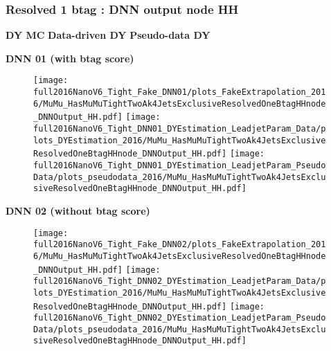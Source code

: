 \documentclass[9pt]{beamer}
\begin{document}
\begin{frame}
	\frametitle{Resolved 1 btag : DNN output node HH}
    \hspace{2cm} \textbf{DY MC} \hspace{1.9cm} \textbf{Data-driven DY} \hspace{1cm} \textbf{Pseudo-data DY}
    \begin{center}
        \textbf{DNN 01 (with btag score)}
    \end{center}
	\begin{figure}
		\texttt{[image: full2016NanoV6\_Tight\_Fake\_DNN01/plots\_FakeExtrapolation\_2016/MuMu\_HasMuMuTightTwoAk4JetsExclusiveResolvedOneBtagHHnode\_DNNOutput\_HH.pdf]}
		\texttt{[image: full2016NanoV6\_Tight\_DNN01\_DYEstimation\_LeadjetParam\_Data/plots\_DYEstimation\_2016/MuMu\_HasMuMuTightTwoAk4JetsExclusiveResolvedOneBtagHHnode\_DNNOutput\_HH.pdf]}
		\texttt{[image: full2016NanoV6\_Tight\_DNN01\_DYEstimation\_LeadjetParam\_PseudoData/plots\_pseudodata\_2016/MuMu\_HasMuMuTightTwoAk4JetsExclusiveResolvedOneBtagHHnode\_DNNOutput\_HH.pdf]}
	\end{figure}
    \begin{center}
        \textbf{DNN 02 (without btag score)}
    \end{center}
	\begin{figure}
		\texttt{[image: full2016NanoV6\_Tight\_Fake\_DNN02/plots\_FakeExtrapolation\_2016/MuMu\_HasMuMuTightTwoAk4JetsExclusiveResolvedOneBtagHHnode\_DNNOutput\_HH.pdf]}
		\texttt{[image: full2016NanoV6\_Tight\_DNN02\_DYEstimation\_LeadjetParam\_Data/plots\_DYEstimation\_2016/MuMu\_HasMuMuTightTwoAk4JetsExclusiveResolvedOneBtagHHnode\_DNNOutput\_HH.pdf]}
		\texttt{[image: full2016NanoV6\_Tight\_DNN02\_DYEstimation\_LeadjetParam\_PseudoData/plots\_pseudodata\_2016/MuMu\_HasMuMuTightTwoAk4JetsExclusiveResolvedOneBtagHHnode\_DNNOutput\_HH.pdf]}
	\end{figure}
\end{frame}
\end{document}
